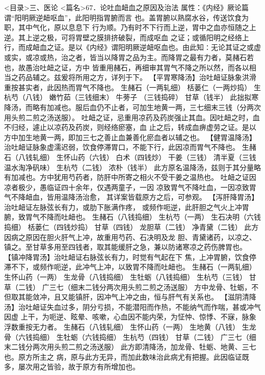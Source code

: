 \documentclass[a4paper,12pt,UTF8,twoside]{ctexbook}
\begin{document}
<目录>三、医论
<篇名>67．论吐血衄血之原因及治法
属性：《内经》厥论篇谓“阳明厥逆衄呕血”，此阳明指胃腑而言 
也。盖胃腑以熟腐水谷，传送饮食为职，其中气化，原以息息下 
行为顺。乃有时不下行而上逆，胃中之血亦恒随之上逆。其上逆之极，可将胃壁之膜排挤破裂，而成呕血 
之证；或循阳明之经络上行，而成衄血之证。是以《内经》谓阳明厥逆衄呕血也。由此知∶无论其证之或虚 
或实，或凉或热，治之者，皆当以降胃之品为主。而降胃之最有力者，莫赭石若也，故愚治吐衄之证，方中 
皆重用赭石，再细审其胃气不降之所以然，而各以相当之药品辅之。兹爰将所用之方，详列于下。 
【平胃寒降汤】治吐衄证脉象洪滑重按甚实者，此因热而胃气不降也。 
生赭石（一两轧细） 栝蒌仁（一两炒捣） 生杭芍（八钱） 嫩竹茹（三钱细末） 牛蒡子 
（三钱捣碎） 甘草（钱半） 
此拙拟寒降汤，而略有加减也。服后血仍不止者，可加生地黄一两，三七细末三钱（分两次用头煎二煎之汤送服）。 
吐衄之证，忌重用凉药及药炭强止其血。因吐衄之时，血不归经，遽止以凉药及药炭，则经络瘀塞，血 
止之后，转成血痹虚劳之证。是以方中加生地黄一两，即加三七之善止血兼善化瘀血者以辅之也。 
【健胃温降汤】治吐衄证脉象虚濡迟弱，饮食停滞胃口，不能下行，此因凉而胃气不降也。 
生赭石（八钱轧细） 生怀山药（六钱） 白术（四钱炒） 干姜（三钱） 
清半夏（三钱温水淘净矾味） 生杭芍（二钱） 浓朴（钱半） 
此方原名温降汤，兹则于其分量略有加减也。方中犹用芍药者，防肝中所寄之相火不受干姜之温热也。 
吐衄之证因凉者极少，愚临证四十余年，仅遇两童子，一因 
凉致胃气不降吐血，一因凉致胃气不降衄血，皆用温降汤治愈， 
其详案皆载原方之后，可参观。 
【泻肝降胃汤】治吐衄证左脉弦长有力，或肋下胀满作疼， 
或频作呃逆，此肝胆之气火上冲胃腑，致胃气不降而吐衄也。 
生赭石（八钱捣细） 生杭芍（一两） 生石决明（六钱捣细） 栝蒌仁（四钱炒捣） 
甘草（四钱） 龙胆草（二钱） 净青黛（二钱） 
此方因病之原因在胆火肝气上冲，故重用芍药、石决明及龙 
胆、青黛诸药，以凉之、镇之。至甘草多用至四钱者，取其能缓肝之急，兼以防诸寒凉之药伤脾胃也。 
【镇冲降胃汤】治吐衄证右脉弦长有力，时觉有气起在下 
焦，上冲胃腑，饮食停滞不下，或频作呃逆，此冲气上冲，以致胃不降而吐衄也。 
生赭石（一两轧细） 生怀山药（一两） 生龙骨（八钱捣细） 生牡蛎（八钱捣细） 
生杭芍（三钱） 甘草（二钱） 广三七（细末二钱分两次用头煎二煎之汤送服） 
方中龙骨、牡蛎，不但取其能敛冲，且又能镇肝，因冲气上冲之由，恒与肝气有关系也。 
【滋阴清降汤】治吐衄证失血过多，阴分亏损，不能潜阳而作热，不能纳气而作喘，甚或冲气因虚 
上干，为呃逆、眩晕、咳嗽，心血因不能内荣，为怔忡、惊悸、不寐，脉象浮数重按无力者。 
生赭石（八钱轧细） 生怀山药（一两） 生地黄（八钱） 生龙骨（六钱捣细） 
生牡蛎（六钱捣细） 生杭芍（四钱） 甘草（二钱） 广三七（细末二钱分两次用头煎二煎之汤送服） 
此方即清降汤，加龙骨、牡蛎、地黄、三七也。原方所主之 
病，原与此方无异，而加此数味治此病尤有把握。此因临证既多，屡次用之皆验，故于原方有所增加也。 
\end{document}
